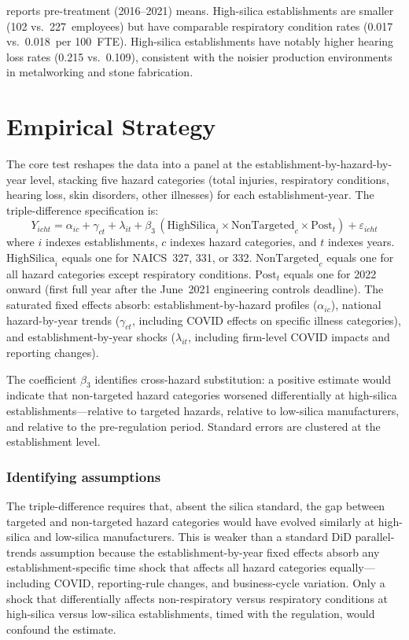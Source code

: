 \documentclass[12pt]{article}
\begin{document}


 reports pre-treatment (2016--2021) means. High-silica establishments are smaller (102 vs.\ 227~employees) but have comparable respiratory condition rates (0.017 vs.\ 0.018~per 100~FTE). High-silica establishments have notably higher hearing loss rates (0.215 vs.\ 0.109), consistent with the noisier production environments in metalworking and stone fabrication.


\section{Empirical Strategy}
\label{sec:strategy}

The core test reshapes the data into a panel at the establishment-by-hazard-by-year level, stacking five hazard categories (total injuries, respiratory conditions, hearing loss, skin disorders, other illnesses) for each establishment-year. The triple-difference specification is:
\begin{equation}
\label{eq:ddd}
Y_{icht} = \alpha_{ic} + \gamma_{ct} + \lambda_{it} + \beta_3 \, (\text{HighSilica}_i \times \text{NonTargeted}_c \times \text{Post}_t) + \varepsilon_{icht}
\end{equation}
where $i$ indexes establishments, $c$ indexes hazard categories, and $t$ indexes years. $\text{HighSilica}_i$ equals one for NAICS~327, 331, or 332. $\text{NonTargeted}_c$ equals one for all hazard categories except respiratory conditions. $\text{Post}_t$ equals one for 2022 onward (first full year after the June~2021 engineering controls deadline). The saturated fixed effects absorb: establishment-by-hazard profiles ($\alpha_{ic}$), national hazard-by-year trends ($\gamma_{ct}$, including COVID effects on specific illness categories), and establishment-by-year shocks ($\lambda_{it}$, including firm-level COVID impacts and reporting changes).

The coefficient $\beta_3$ identifies cross-hazard substitution: a positive estimate would indicate that non-targeted hazard categories worsened differentially at high-silica establishments---relative to targeted hazards, relative to low-silica manufacturers, and relative to the pre-regulation period. Standard errors are clustered at the establishment level.

\subsubsection*{Identifying assumptions}  The triple-difference requires that, absent the silica standard, the gap between targeted and non-targeted hazard categories would have evolved similarly at high-silica and low-silica manufacturers. This is weaker than a standard DiD parallel-trends assumption because the establishment-by-year fixed effects absorb any establishment-specific time shock that affects all hazard categories equally---including COVID, reporting-rule changes, and business-cycle variation. Only a shock that differentially affects non-respiratory versus respiratory conditions at high-silica versus low-silica establishments, timed with the regulation, would confound the estimate.
\end{document}
